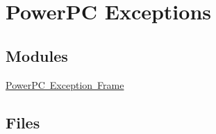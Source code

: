 \hypertarget{group__ppc__exc}{}\section{Power\+PC Exceptions}
\label{group__ppc__exc}
\subsection*{Modules}
\begin{DoxyCompactItemize}
\item 
\mbox{\hyperlink{group__ppc__exc__frame}{Power\+P\+C Exception Frame}}
\end{DoxyCompactItemize}
\subsection*{Files}
